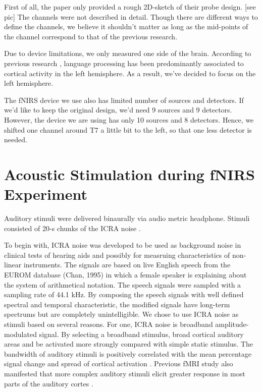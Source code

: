 First of all, the paper only provided a rough 2D-sketch of their probe design. [see pic] The channels were not described in detail. Though there are different ways to define the channels, we believe it shouldn't matter as long as the mid-points of the channel correspond to that of the previous research.

Due to device limitations, we only measured one side of the brain. According to previous research \cite {Frost1999-vs} , language processing has been predominantly associated to cortical activity in the left hemisphere. As a result, we've decided to focus on the left hemisphere.

The fNIRS device we use also has limited number of sources and detectors. If we'd like to keep the original design, we'd need 9 sources and 9 detectors. However, the device we are using has only 10 sources and 8 detectors. Hence, we shifted one channel around T7 a little bit to the left, so that one less detector is needed.




\section {Acoustic Stimulation during fNIRS Experiment}
Auditory stimuli were delivered binaurally via audio metric headphone. Stimuli consisted of 20-s chunks of the ICRA noise \cite {Dreschler}. 

 To begin with, ICRA noise was developed to be used as background noise in clinical tests of hearing aids and possibly for measruing characteristics of non-linear instruments. The signals are based on live English speech from the EUROM database (Chan, 1995) in which a female speaker is explaining about the system of arithmetical notation. The speech signals were sampled with a sampling rate of 44.1 kHz. By composing the speech signals with well defined spectral and temporal characteristic, the modified signals have long-term spectrums but are completely unintelligible. We chose to use ICRA noise as stimuli based on several reasons. For one, ICRA noise is broadband amplitude-modulated signal. By selecting a broadband stimulus, broad cortical auditory areas and be activated more strongly compared with simple static stimulus. The bandwidth of auditory stimuli is positively correlated with the mean percentage signal change and spread of cortical activation \cite {Hall}. Previous fMRI study also manifested that more complex auditory stimuli elicit greater response in most parts of the auditory cortes \cite {Belin}.
 
